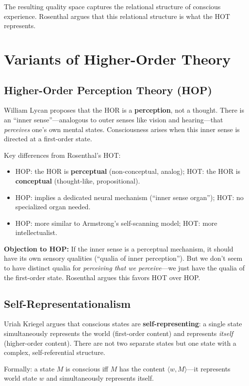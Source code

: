\documentclass[11pt,a4paper]{report}
\begin{document}
The resulting quality space captures the relational structure of conscious experience. Rosenthal argues that this relational structure is what the HOT represents.


\chapter{Variants of Higher-Order Theory}

\section{Higher-Order Perception Theory (HOP)}

\begin{varbox}
William Lycan proposes that the HOR is a \textbf{perception}, not a thought. There is an ``inner sense''---analogous to outer senses like vision and hearing---that \emph{perceives} one's own mental states. Consciousness arises when this inner sense is directed at a first-order state.
\end{varbox}

Key differences from Rosenthal's HOT:
\begin{itemize}[leftmargin=1.5em]
  \item HOP: the HOR is \textbf{perceptual} (non-conceptual, analog); HOT: the HOR is \textbf{conceptual} (thought-like, propositional).
  \item HOP: implies a dedicated neural mechanism (``inner sense organ''); HOT: no specialized organ needed.
  \item HOP: more similar to Armstrong's self-scanning model; HOT: more intellectualist.
\end{itemize}

\textbf{Objection to HOP:} If the inner sense is a perceptual mechanism, it should have its own sensory qualities (``qualia of inner perception''). But we don't seem to have distinct qualia for \emph{perceiving that we perceive}---we just have the qualia of the first-order state. Rosenthal argues this favors HOT over HOP.

\section{Self-Representationalism}

\begin{varbox}
Uriah Kriegel argues that conscious states are \textbf{self-representing}: a single state simultaneously represents the world (first-order content) and represents \emph{itself} (higher-order content). There are not two separate states but one state with a complex, self-referential structure.

Formally: a state $M$ is conscious iff $M$ has the content $\langle w, M \rangle$---it represents world state $w$ and simultaneously represents itself.
\end{varbox}
\end{document}
